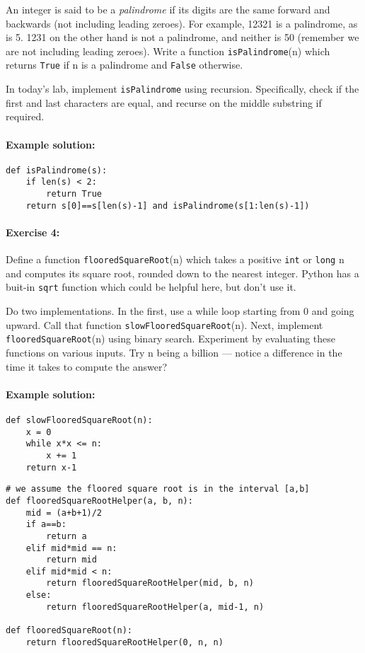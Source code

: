 \documentclass[11pt]{article}
\begin{document}
\medskip

An integer is said to be a {\em palindrome} if its digits are the same
forward and backwards (not including leading zeroes). For example,
12321 is a palindrome, as is 5.  1231 on the other hand is not a
palindrome, and neither is 50 (remember we are not including leading
zeroes).
Write a function \texttt{isPalindrome}(n) which returns
\texttt{True} if n is a palindrome and \texttt{False} otherwise.

\medskip

In today's lab, implement \texttt{isPalindrome} using recursion.
Specifically, check if the first and last characters are equal, and
recurse on the middle substring if required.

\paragraph{Example solution:}
\begin{verbatim}
def isPalindrome(s):
    if len(s) < 2:
        return True
    return s[0]==s[len(s)-1] and isPalindrome(s[1:len(s)-1])
\end{verbatim}

\paragraph{Exercise 4:}
Define a function \texttt{flooredSquareRoot}(n)
which takes a positive \texttt{int} or \texttt{long} n and computes
its square root, rounded down to the nearest integer.  Python has a
buit-in \texttt{sqrt} function which could be helpful here, but don't
use it.

Do two implementations.  In the first, use a while loop starting from
$0$ and going upward.  Call that function
\texttt{slowFlooredSquareRoot}(n). Next, implement
\texttt{flooredSquareRoot}(n) using binary search.  Experiment by
evaluating these functions on various inputs.  Try n being a billion
--- notice a difference in the time it takes to compute the answer?

\paragraph{Example solution:}
\begin{verbatim}
def slowFlooredSquareRoot(n):
    x = 0
    while x*x <= n:
        x += 1
    return x-1
\end{verbatim}

\begin{verbatim}
# we assume the floored square root is in the interval [a,b]
def flooredSquareRootHelper(a, b, n):
    mid = (a+b+1)/2
    if a==b:
        return a
    elif mid*mid == n:
        return mid
    elif mid*mid < n:
        return flooredSquareRootHelper(mid, b, n)
    else:
        return flooredSquareRootHelper(a, mid-1, n)

def flooredSquareRoot(n):
    return flooredSquareRootHelper(0, n, n)
\end{verbatim}
\end{document}

